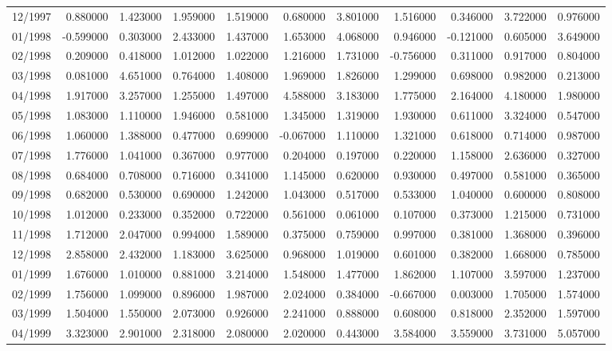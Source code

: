 \begin{tabular}{lrrrrrrrrrr}
12/1997 & 0.880000 & 1.423000 & 1.959000 & 1.519000 & 0.680000 & 3.801000 & 1.516000 & 0.346000 & 3.722000 & 0.976000 \\
01/1998 & -0.599000 & 0.303000 & 2.433000 & 1.437000 & 1.653000 & 4.068000 & 0.946000 & -0.121000 & 0.605000 & 3.649000 \\
02/1998 & 0.209000 & 0.418000 & 1.012000 & 1.022000 & 1.216000 & 1.731000 & -0.756000 & 0.311000 & 0.917000 & 0.804000 \\
03/1998 & 0.081000 & 4.651000 & 0.764000 & 1.408000 & 1.969000 & 1.826000 & 1.299000 & 0.698000 & 0.982000 & 0.213000 \\
04/1998 & 1.917000 & 3.257000 & 1.255000 & 1.497000 & 4.588000 & 3.183000 & 1.775000 & 2.164000 & 4.180000 & 1.980000 \\
05/1998 & 1.083000 & 1.110000 & 1.946000 & 0.581000 & 1.345000 & 1.319000 & 1.930000 & 0.611000 & 3.324000 & 0.547000 \\
06/1998 & 1.060000 & 1.388000 & 0.477000 & 0.699000 & -0.067000 & 1.110000 & 1.321000 & 0.618000 & 0.714000 & 0.987000 \\
07/1998 & 1.776000 & 1.041000 & 0.367000 & 0.977000 & 0.204000 & 0.197000 & 0.220000 & 1.158000 & 2.636000 & 0.327000 \\
08/1998 & 0.684000 & 0.708000 & 0.716000 & 0.341000 & 1.145000 & 0.620000 & 0.930000 & 0.497000 & 0.581000 & 0.365000 \\
09/1998 & 0.682000 & 0.530000 & 0.690000 & 1.242000 & 1.043000 & 0.517000 & 0.533000 & 1.040000 & 0.600000 & 0.808000 \\
10/1998 & 1.012000 & 0.233000 & 0.352000 & 0.722000 & 0.561000 & 0.061000 & 0.107000 & 0.373000 & 1.215000 & 0.731000 \\
11/1998 & 1.712000 & 2.047000 & 0.994000 & 1.589000 & 0.375000 & 0.759000 & 0.997000 & 0.381000 & 1.368000 & 0.396000 \\
12/1998 & 2.858000 & 2.432000 & 1.183000 & 3.625000 & 0.968000 & 1.019000 & 0.601000 & 0.382000 & 1.668000 & 0.785000 \\
01/1999 & 1.676000 & 1.010000 & 0.881000 & 3.214000 & 1.548000 & 1.477000 & 1.862000 & 1.107000 & 3.597000 & 1.237000 \\
02/1999 & 1.756000 & 1.099000 & 0.896000 & 1.987000 & 2.024000 & 0.384000 & -0.667000 & 0.003000 & 1.705000 & 1.574000 \\
03/1999 & 1.504000 & 1.550000 & 2.073000 & 0.926000 & 2.241000 & 0.888000 & 0.608000 & 0.818000 & 2.352000 & 1.597000 \\
04/1999 & 3.323000 & 2.901000 & 2.318000 & 2.080000 & 2.020000 & 0.443000 & 3.584000 & 3.559000 & 3.731000 & 5.057000 \\

\end{tabular}
